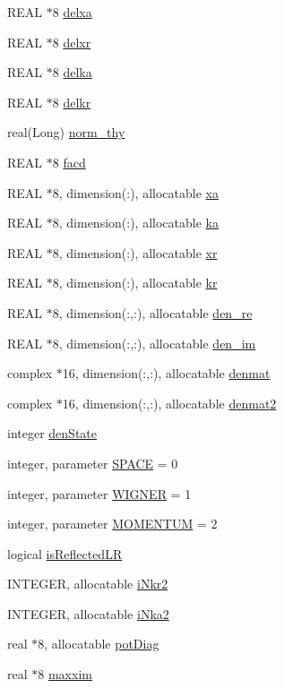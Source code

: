 \begin{DoxyCompactItemize}
REAL $\ast$8 \hyperlink{namespacemesh_a4bbd964b605a9fedc6fd4b5feaf2d226}{delxa}
\item 
REAL $\ast$8 \hyperlink{namespacemesh_a8517784a828d82832ad38e911e58cdf1}{delxr}
\item 
REAL $\ast$8 \hyperlink{namespacemesh_a93c5cfe69a9cda5c977adaf99030481d}{delka}
\item 
REAL $\ast$8 \hyperlink{namespacemesh_a30ce8cdfbc09510b555134e5ee1c2472}{delkr}
\item 
real(Long) \hyperlink{namespacemesh_a753aba092294fa8bffbee1fc1b099584}{norm\_\-thy}
\item 
REAL $\ast$8 \hyperlink{namespacemesh_a43130e9d2b4c80b7862ea7d6226a7a4d}{facd}
\item 
REAL $\ast$8, dimension(:), allocatable \hyperlink{namespacemesh_af9469b274e48a8fcc34f1c8df7976271}{xa}
\item 
REAL $\ast$8, dimension(:), allocatable \hyperlink{namespacemesh_acdc9121ee94e3c62c59255106d13fddd}{ka}
\item 
REAL $\ast$8, dimension(:), allocatable \hyperlink{namespacemesh_a0351493d48c86a4a92f34aa94f8cc099}{xr}
\item 
REAL $\ast$8, dimension(:), allocatable \hyperlink{namespacemesh_a0eb10f03f0d716aafcb803855dff1b80}{kr}
\item 
REAL $\ast$8, dimension(:,:), allocatable \hyperlink{namespacemesh_af15f870e8317605924334a07ecfe3b28}{den\_\-re}
\item 
REAL $\ast$8, dimension(:,:), allocatable \hyperlink{namespacemesh_a88e07a02f831434825843fa4d74b7bc0}{den\_\-im}
\item 
complex $\ast$16, dimension(:,:), allocatable \hyperlink{namespacemesh_ad78af6f9bdcc56004176e07e81d419f8}{denmat}
\item 
complex $\ast$16, dimension(:,:), allocatable \hyperlink{namespacemesh_ac1de4684ee911518c05caaa4c6dcf484}{denmat2}
\item 
integer \hyperlink{namespacemesh_a451ed2546542175ea54b5c9a780b5462}{denState}
\item 
integer, parameter \hyperlink{namespacemesh_a0c6bae5d6531a6b0f0428c0c056f759d}{SPACE} = 0
\item 
integer, parameter \hyperlink{namespacemesh_a4e989d120872f8573cf4454bfc6a0d31}{WIGNER} = 1
\item 
integer, parameter \hyperlink{namespacemesh_a58029be857a15564e9ebaee23b4d887a}{MOMENTUM} = 2
\item 
logical \hyperlink{namespacemesh_ac40d4b15a769844035c498c2ed396e4c}{isReflectedLR}
\item 
INTEGER, allocatable \hyperlink{namespacemesh_a4a147979d603b0d2f61b08be8bd3e40e}{iNkr2}
\item 
INTEGER, allocatable \hyperlink{namespacemesh_a6103232aa20c5d4619b9016bda1e0cbe}{iNka2}
\item 
real $\ast$8, allocatable \hyperlink{namespacemesh_a6e7109b1ed1096ce6c3dbacaa4920158}{potDiag}
\item 
real $\ast$8 \hyperlink{namespacemesh_aa7d7e6a7c12152ba29110facf1d664ce}{maxxim}
\end{DoxyCompactItemize}


